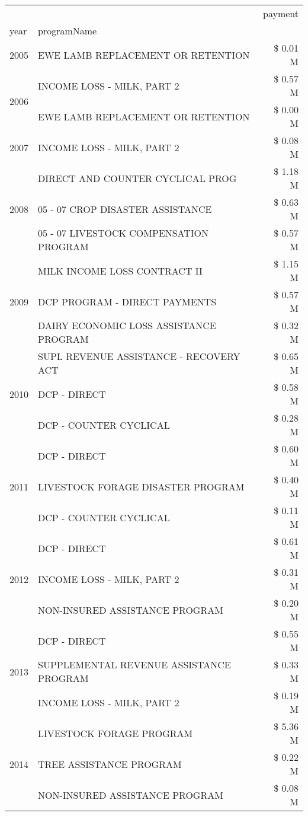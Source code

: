 \begin{tabular}{llr}
\toprule
 &  & payment \\
year & programName &  \\
\midrule
2005 & EWE LAMB REPLACEMENT OR RETENTION & \$ 0.01 M \\
\cline{1-3}
\multirow[t]{2}{*}{2006} & INCOME LOSS - MILK, PART 2 & \$ 0.57 M \\
 & EWE LAMB REPLACEMENT OR RETENTION & \$ 0.00 M \\
\cline{1-3}
2007 & INCOME LOSS - MILK, PART 2 & \$ 0.08 M \\
\cline{1-3}
\multirow[t]{3}{*}{2008} & DIRECT AND COUNTER CYCLICAL PROG & \$ 1.18 M \\
 & 05 - 07 CROP DISASTER ASSISTANCE & \$ 0.63 M \\
 & 05 - 07 LIVESTOCK COMPENSATION PROGRAM & \$ 0.57 M \\
\cline{1-3}
\multirow[t]{3}{*}{2009} & MILK INCOME LOSS CONTRACT II & \$ 1.15 M \\
 & DCP PROGRAM - DIRECT PAYMENTS & \$ 0.57 M \\
 & DAIRY ECONOMIC LOSS ASSISTANCE PROGRAM & \$ 0.32 M \\
\cline{1-3}
\multirow[t]{3}{*}{2010} & SUPL REVENUE ASSISTANCE - RECOVERY ACT & \$ 0.65 M \\
 & DCP - DIRECT & \$ 0.58 M \\
 & DCP - COUNTER CYCLICAL & \$ 0.28 M \\
\cline{1-3}
\multirow[t]{3}{*}{2011} & DCP - DIRECT & \$ 0.60 M \\
 & LIVESTOCK FORAGE DISASTER PROGRAM & \$ 0.40 M \\
 & DCP - COUNTER CYCLICAL & \$ 0.11 M \\
\cline{1-3}
\multirow[t]{3}{*}{2012} & DCP - DIRECT & \$ 0.61 M \\
 & INCOME LOSS - MILK, PART 2 & \$ 0.31 M \\
 & NON-INSURED ASSISTANCE PROGRAM & \$ 0.20 M \\
\cline{1-3}
\multirow[t]{3}{*}{2013} & DCP - DIRECT & \$ 0.55 M \\
 & SUPPLEMENTAL REVENUE ASSISTANCE PROGRAM & \$ 0.33 M \\
 & INCOME LOSS - MILK, PART 2 & \$ 0.19 M \\
\cline{1-3}
\multirow[t]{3}{*}{2014} & LIVESTOCK FORAGE PROGRAM & \$ 5.36 M \\
 & TREE ASSISTANCE PROGRAM & \$ 0.22 M \\
 & NON-INSURED ASSISTANCE PROGRAM & \$ 0.08 M \\

\end{tabular}
